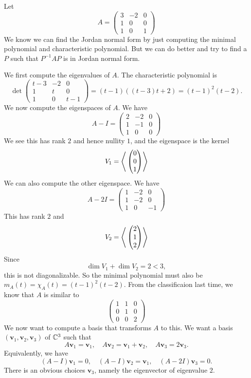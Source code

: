 \documentclass[a4paper,11pt]{article}
\begin{document}
\begin{example}
	Let
	\[
	  A =
	  \begin{pmatrix}
		3 & -2 & 0\\
		1 & 0 & 0\\
		1 & 0 & 1
	  \end{pmatrix}
	\]
	We know we can find the Jordan normal form by just computing the minimal polynomial and characteristic polynomial. But we can do better and try to find a $P$ such that $P^{-1}AP$ is in Jordan normal form.
  
	We first compute the eigenvalues of $A$. The characteristic polynomial is
	\[
	  \det \begin{pmatrix}
		t - 3 & -2 & 0\\
		1 & t & 0\\
		1 & 0 & t - 1
	  \end{pmatrix} = (t - 1)((t - 3)t + 2) = (t - 1)^2 (t - 2).
	\]
	We now compute the eigenspaces of $A$. We have
	\[
	  A - I =
	  \begin{pmatrix}
		2 & -2 & 0\\
		1 & -1 & 0\\
		1 & 0 & 0
	  \end{pmatrix}
	\]
	We see this has rank $2$ and hence nullity $1$, and the eigenspace is the kernel
	\[
	  V_1 = \left\langle{} 
	  \begin{pmatrix}
		0\\0\\1
	  \end{pmatrix} \right\rangle
	\]
	We can also compute the other eigenspace. We have
	\[
	  A - 2I =
	  \begin{pmatrix}
		1 & -2 & 0\\
		1 & -2 & 0\\
		1 & 0 & -1
	  \end{pmatrix}
	\]
	This has rank $2$ and
	\[
	  V_2 = \left\langle{} 
	  \begin{pmatrix}
		2 \\ 1 \\ 2
	  \end{pmatrix} \right\rangle
	\]
	Since
	\[
	  \dim V_1 + \dim V_2 = 2 < 3,
	\]
	this is not diagonalizable. So the minimal polynomial must also be $m_A(t) = \chi_A(t) = (t - 1)^2 (t - 2)$. From the classificaion last time, we know that $A$ is similar to
	\[
	  \begin{pmatrix}
		1 & 1 & 0\\
		0 & 1 & 0\\
		0 & 0 & 2
	  \end{pmatrix}
	\]
	We now want to compute a basis that transforms $A$ to this. We want a basis $(\mathbf{v}_1, \mathbf{v}_2, \mathbf{v}_3)$ of ${\mathbb{C}}^3$ such that
	\[
	  A\mathbf{v}_1 = \mathbf{v}_1,\quad A\mathbf{v}_2 = \mathbf{v}_1 + \mathbf{v}_2,\quad A \mathbf{v}_3 = 2\mathbf{v}_3.
	\]
	Equivalently, we have
	\[
	  (A - I)\mathbf{v}_1 = 0,\quad (A - I)\mathbf{v}_2 = \mathbf{v}_1, \quad (A - 2I)\mathbf{v}_3 = 0.
	\]
	There is an obvious choices $\mathbf{v}_3$, namely the eigenvector of eigenvalue $2$.
  

\end{example}
\end{document}
